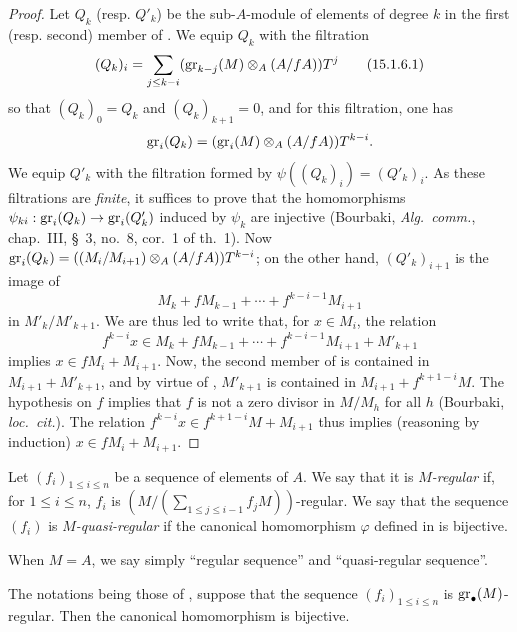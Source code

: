 \begin{proof}
Let $Q_k$ (resp. $Q'_k$) be the sub-$A$-module of elements of degree $k$ in the first (resp. second) member of .
We equip $Q_k$ with the filtration
\[
\label{0.15.1.6.1}
  (Q_k)_i = \sum_{j\leq k-i} (\operatorname{gr}_{k-j}(M)\otimes_A(A/fA))T^j
\tag{15.1.6.1}
\]
so that $(Q_k)_0=Q_k$ and $(Q_k)_{k+1}=0$, and for this filtration, one has
\[
  \operatorname{gr}_i(Q_k) = (\operatorname{gr}_i(M)\otimes_A(A/fA))T^{k-i}.
\]
We equip $Q'_k$ with the filtration formed by $\psi((Q_k)_i)=(Q'_k)_i$.
As these filtrations are \emph{finite}, it suffices to prove that the homomorphisms $\psi_{ki}:\operatorname{gr}_i(Q_k)\to\operatorname{gr}_i(Q'_k)$ induced by $\psi_k$ are injective
(Bourbaki, \emph{Alg.~comm.}, chap.~III, \S~3, no.~8, cor.~1 of th.~1).
Now $\operatorname{gr}_i(Q_k)=((M_i/M_{i+1})\otimes_A(A/fA))T^{k-i}$;
on the other hand, $(Q'_k)_{i+1}$ is the image of
\[
  M_k+fM_{k-1}+\cdots+f^{k-i-1}M_{i+1}
\]
in $M'_k/M'_{k+1}$.
We are thus led to write that, for $x\in M_i$, the relation
\[
\label{0.15.1.6.2}
  f^{k-i}x\in M_k+fM_{k-1}+\cdots+f^{k-i-1}M_{i+1}+M'_{k+1}
\tag{15.1.6.2}
\]
implies $x\in fM_i+M_{i+1}$.
Now, the second member of  is contained in $M_{i+1}+M'_{k+1}$, and by virtue of , $M'_{k+1}$ is contained in $M_{i+1}+f^{k+1-i}M$.
The hypothesis on $f$ implies that $f$ is not a zero divisor in $M/M_h$ for all $h$
(Bourbaki, \emph{loc.~cit.}).
The relation $f^{k-i}x\in f^{k+1-i}M+M_{i+1}$ thus implies (reasoning by induction) $x\in fM_i+M_{i+1}$.
\end{proof}

\begin{definition}[15.1.7]
\label{0.15.1.7}
Let $(f_i)_{1\leq i\leq n}$ be a sequence of elements of $A$.
We say that it is \emph{$M$-regular} if, for $1\leq i\leq n$, $f_i$ is $(M/(\sum_{1\leq j\leq i-1}f_jM))$-regular.
We say that the sequence $(f_i)$ is \emph{$M$-quasi-regular} if the canonical homomorphism $\varphi$ defined in  is bijective.

When $M=A$, we say simply ``regular sequence'' and ``quasi-regular sequence''.
\end{definition}

\begin{proposition}[15.1.8]
\label{0.15.1.8}
The notations being those of , suppose that the sequence $(f_i)_{1\leq i\leq n}$ is $\operatorname{gr}_\bullet(M)$-regular.
Then the canonical homomorphism  is bijective.
\end{proposition}

